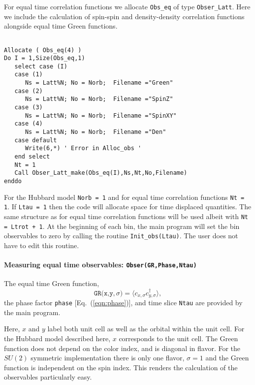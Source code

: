 For equal time correlation  functions  we allocate  \texttt{Obs\_eq}  of type \texttt{Obser\_Latt}.  Here we include the calculation of spin-spin and density-density correlation functions alongside equal time Green functions. 
\begin{lstlisting}

Allocate ( Obs_eq(4) )
Do I = 1,Size(Obs_eq,1)
   select case (I)
   case (1)
      Ns = Latt%N; No = Norb;  Filename ="Green"
   case (2)
      Ns = Latt%N; No = Norb;  Filename ="SpinZ"
   case (3)
      Ns = Latt%N; No = Norb;  Filename ="SpinXY"
   case (4)
      Ns = Latt%N; No = Norb;  Filename ="Den"
   case default
      Write(6,*) ' Error in Alloc_obs '  
   end select
   Nt = 1
   Call Obser_Latt_make(Obs_eq(I),Ns,Nt,No,Filename)
enddo
 \end{lstlisting} 
 For the Hubbard model \texttt{Norb = 1} and for   equal time correlation functions   \texttt{Nt = 1}.       If  \texttt{Ltau = 1}  then the code will allocate space for  time displaced quantities.   The same structure as for  equal time correlation functions will be used albeit with  \texttt{Nt = Ltrot + 1}.  At the beginning of each bin, the main program will set the bin observables to zero by calling  the routine 
 \texttt{Init\_obs(Ltau)}.   The user does not have to edit this routine. 
 
\paragraph{Measuring equal time observables: \texttt{Obser(GR,Phase,Ntau)}}

The equal time  Green function,
\begin{equation}
	 \texttt{GR(x,y},\sigma{\texttt)}  = \langle c^{\phantom{\dagger}}_{x,\sigma} c^{\dagger}_{y,\sigma}  \rangle,
\end{equation}
the  phase factor \texttt{phase} [Eq.~(\ref{eqn:phase})], and time slice \texttt{Ntau}   are provided by the main program.  

Here,   $x$ and $y$ label  both unit cell as well as the orbital within the unit cell. For the Hubbard model described here, $x$ corresponds to the unit cell.  The Green function  does not depend on the color index, and is diagonal in flavor.  For the $SU(2)$ symmetric implementation  there is only one flavor, $\sigma = 1$ and the Green function is  independent on the spin index.  This renders the calculation of the observables particularly easy.   

